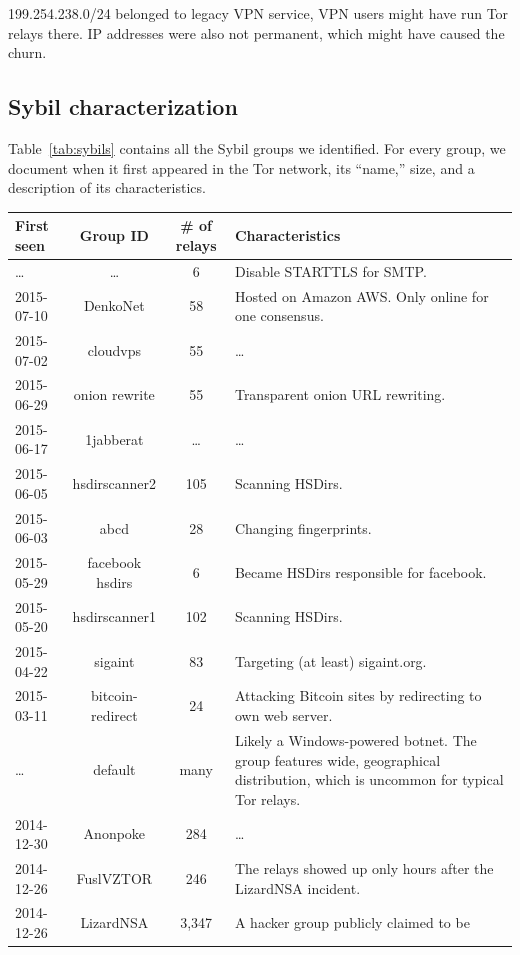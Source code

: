 199.254.238.0/24
belonged to legacy VPN service, VPN users might have run Tor relays there.
IP addresses were also not permanent, which might have caused the churn.

\subsection{Sybil characterization}
\label{sec:sybil_groups}
Table~\ref{tab:sybils} contains all the Sybil groups we identified.  For every
group, we document when it first appeared in the Tor network, its ``name,''
size, and a description of its characteristics.

\begin{table}[t]
\centering
\begin{tabular}{l c c p{10cm}}
\textbf{First seen} & \textbf{Group ID} & \textbf{\# of relays} & \textbf{Characteristics} \\
\hline
\ldots & \ldots & 6 & Disable STARTTLS for SMTP. \\
2015-07-10 & DenkoNet & 58 & Hosted on Amazon AWS.  Only online for one consensus. \\
2015-07-02 & cloudvps & 55 & \ldots \\
2015-06-29 & onion rewrite & 55 & Transparent onion URL rewriting. \\
2015-06-17 & 1jabberat & \ldots & \ldots \\
2015-06-05 & hsdirscanner2 & 105 & Scanning HSDirs. \\
2015-06-03 & abcd & 28 & Changing fingerprints. \\
2015-05-29 & facebook hsdirs & 6 & Became HSDirs responsible for facebook.  \\
2015-05-20 & hsdirscanner1 & 102 & Scanning HSDirs. \\
2015-04-22 & sigaint & 83 & Targeting (at least) sigaint.org. \\
2015-03-11 & bitcoin-redirect & 24 & Attacking Bitcoin sites by redirecting to own web server. \\
\ldots & default & many & Likely a Windows-powered botnet.  The group
features wide, geographical distribution, which is uncommon for typical Tor
relays. \\
2014-12-30 & Anonpoke & 284 & \ldots\\
2014-12-26 & FuslVZTOR & 246 & The relays showed up only hours after the
LizardNSA incident. \\
2014-12-26 & LizardNSA & 3,347 & A hacker group publicly claimed to be

\end{tabular}
\end{table}
